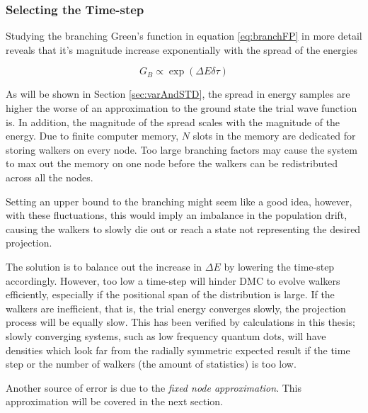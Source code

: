 \subsubsection{Selecting the Time-step}

Studying the branching Green's function in equation \ref{eq:branchFP} in more detail reveals that it's magnitude increase exponentially with the spread of the energies

\begin{equation}
G_B \propto \exp{\left(\Delta E\delta\tau\right)} 
\end{equation}

As will be shown in Section \ref{sec:varAndSTD}, the spread in energy samples are higher the worse of an approximation to the ground state the trial wave function is. In addition, the magnitude of the spread scales with the magnitude of the energy. Due to finite computer memory, $N$ slots in the memory are dedicated for storing walkers on every node. Too large branching factors may cause the system to max out the memory on one node before the walkers can be redistributed across all the nodes. 

Setting an upper bound to the branching might seem like a good idea, however, with these fluctuations, this would imply an imbalance in the population drift, causing the walkers to slowly die out or reach a state not representing the desired projection.

The solution is to balance out the increase in $\Delta E$ by lowering the time-step accordingly. However, too low a time-step will hinder DMC to evolve walkers efficiently, especially if the positional span of the distribution is large. If the walkers are inefficient, that is, the trial energy converges slowly, the projection process will be equally slow. This has been verified by calculations in this thesis; slowly converging systems, such as low frequency quantum dots, will have densities which look far from the radially symmetric expected result if the time step or the number of walkers (the amount of statistics) is too low.

Another source of error is due to the \textit{fixed node approximation}. This approximation will be covered in the next section.

